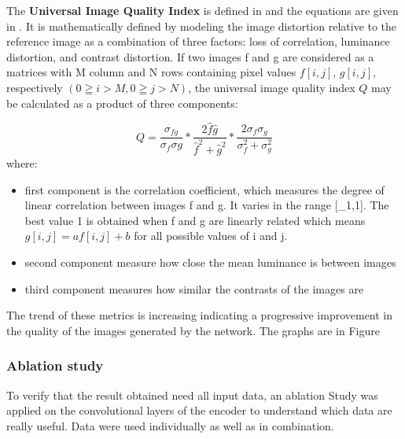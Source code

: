 The \textbf{Universal Image Quality Index} is defined in and the equations are given in \cite{universal_image_quality_index}. It is mathematically defined by modeling the image distortion relative to the reference image as a combination of three factors: loss of correlation, luminance distortion, and contrast distortion. If two images f and g are considered as a matrices with M column and N rows containing pixel values $f[i,j]$, $g[i,j]$, respectively $(0 \geqq i > M, 0 \geqq j > N )$, the universal image quality index $Q$ may be calculated as a product of three components:

\begin{equation}
    Q = \frac{\sigma_{fg}}{\sigma_{f}\sigma{g}} * \frac{2\hat{f}\hat{g}}{\hat{f}^2 + \hat{g}^2} * \frac{2\sigma_{f}\sigma_{g}}{\sigma_f^2 + \sigma_g^2}
\end{equation}
where:
\begin{itemize}
    \item first component is the correlation coefficient, which measures the degree of linear correlation between images f and g. It varies in the range [_1,1]. The best value 1 is obtained when f and g are linearly related which means $g[i,j] = af[i,j]+b$ for all possible values of i and j.
    \item second component measure how close the mean luminance is between images
    \item third component measures how similar the contrasts of the images are
\end{itemize}

The trend of these metrics is increasing indicating a progressive improvement in the quality of the images generated by the network. The graphs are in Figure

\subsubsection{Ablation study}

To verify that the result obtained need all input data, an ablation Study was applied on the convolutional layers of the encoder to understand which data are really useful. Data were used individually as well as in combination.

